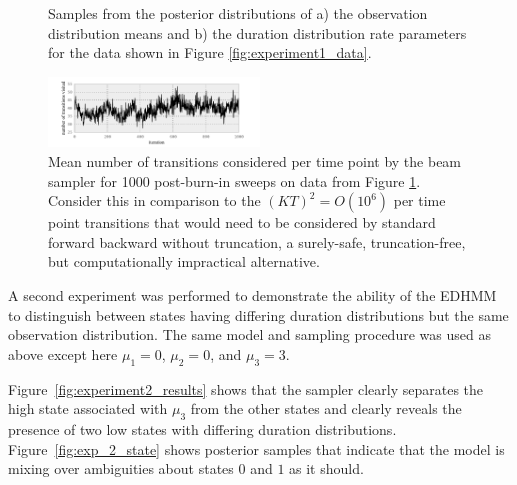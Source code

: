 \begin{figure}
    \caption{Samples from the posterior distributions of a) the observation distribution means and b) the duration distribution rate parameters for the data shown in Figure \ref{fig:experiment1_data}.}
    \label{fig:experiment1_results}
\end{figure}

\begin{figure}
    \includegraphics[width=0.5\textwidth]{../pic/number_transitions_visited.pdf}

\caption{Mean number of transitions considered per time point by the beam sampler for 1000 post-burn-in sweeps on data from Figure \ref{fig:experiment1_results}. Consider this in comparison to the $(KT)^2 = O(10^6)$ per time point transitions that would need to be considered by standard forward backward without truncation, a surely-safe, truncation-free, but computationally impractical alternative.}
\label{fig:allowed}
\end{figure}

A second experiment was performed to demonstrate the ability of the EDHMM to distinguish between states having differing duration distributions but the same observation distribution. The same model and sampling procedure was used as above except here $\mu_1 = 0$, $\mu_2 = 0$, and $\mu_3 = 3$.

Figure~\ref{fig:experiment2_results} shows that the sampler clearly separates the high state associated with $\mu_3$ from the other states and clearly 
reveals the presence of
two  low states with differing duration distributions.   
Figure~\ref{fig:exp_2_state} shows posterior samples that indicate that the model is mixing over ambiguities about states $0$ and $1$ as it should. %

